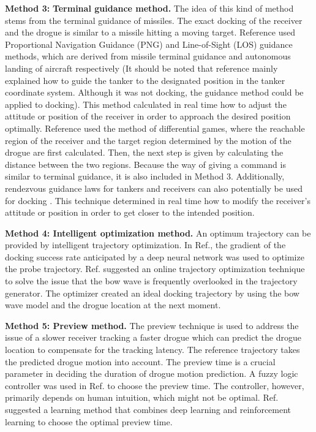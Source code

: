 \textbf{Method 3:} \textbf{Terminal guidance method.} The idea of
this kind of method stems from the terminal guidance of missiles.
The exact docking of the receiver and the drogue is similar to a missile
hitting a moving target. Reference \cite{ochi2005flight} used Proportional
Navigation Guidance (PNG) and Line-of-Sight (LOS) guidance methods,
which are derived from missile terminal guidance and autonomous landing
of aircraft respectively (It should be noted that reference \cite{ochi2005flight}
mainly explained how to guide the tanker to the designated position
in the tanker coordinate system. Although it was not docking, the
guidance method could be applied to docking). This method calculated
in real time how to adjust the attitude or position of the receiver
in order to approach the desired position optimally. Reference \cite{wang2010verifiable}
used the method of differential games, where the reachable region
of the receiver and the target region determined by the motion of
the drogue are first calculated. Then, the next step is given by calculating
the distance between the two regions. Because the way of giving a
command is similar to terminal guidance, it is also included in Method
3. Additionally, rendezvous guidance laws for tankers and receivers
can also potentially be used for docking \cite{luo2014guidance,tsukerman2018optimal}.
This technique determined in real time how to modify the receiver's
attitude or position in order to get closer to the intended position.

\textbf{Method 4: Intelligent optimization method. }An optimum trajectory
can be provided by intelligent trajectory optimization. In Ref.\cite{liu2020docking},
the gradient of the docking success rate anticipated by a deep neural
network was used to optimize the probe trajectory. Ref.\cite{liu2018deep}
suggested an online trajectory optimization technique to solve the
issue that the bow wave is frequently overlooked in the trajectory
generator. The optimizer created an ideal docking trajectory by using
the bow wave model and the drogue location at the next moment. 

\textbf{Method 5: Preview method.} The preview technique \cite{su2017back,liu2019novel}
is used to address the issue of a slower receiver tracking a faster
drogue which can predict the drogue location to compensate for the
tracking latency. The reference trajectory takes the predicted drogue
motion into account. The preview time is a crucial parameter in deciding
the duration of drogue motion prediction. A fuzzy logic controller
was used in Ref.\cite{su2017back} to choose the preview time. The
controller, however, primarily depends on human intuition, which might
not be optimal. Ref.\cite{liu2019novel} suggested a learning method
that combines deep learning and reinforcement learning to choose the
optimal preview time. 

